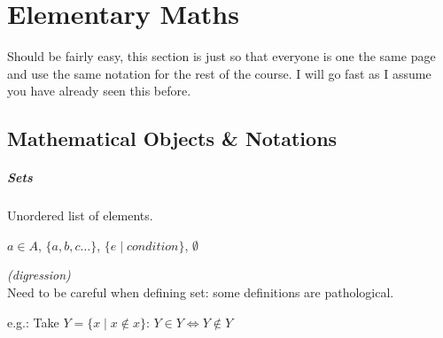 \section{Elementary Maths}
Should be fairly easy, this section is just so that everyone is one the same page and use the same notation for the rest of the course.
I will go fast as I assume you have already seen this before.
\subsection{Mathematical Objects \& Notations}
\subparagraph{Sets}
\begin{definition}[Sets]
    Unordered list of elements.
\end{definition}
\begin{notation}[Sets]
    $a \in A$, $\{ a, b, c \dots \}$, $\{ e \mid condition \}$, $\emptyset$
\end{notation}
\begin{remark}
    \textit{(digression)}\\
    Need to be careful when defining set: some definitions are pathological.
    
    e.g.: Take $Y = \{x \mid x \not\in x\}$:
    $Y \in Y \iff Y \not\in Y$
\end{remark}

